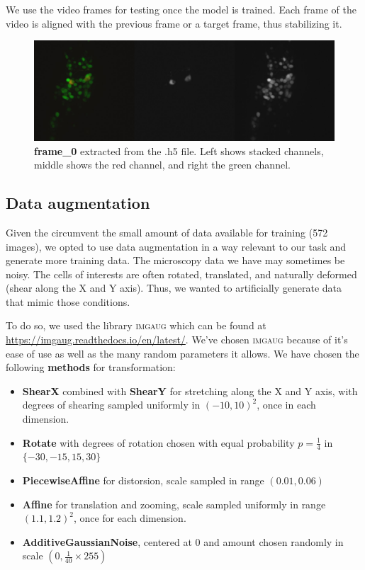 \documentclass[10pt,conference,compsocconf]{IEEEtran}
\begin{document}
We use the video frames for testing once the model is trained. Each frame of the video is aligned with the previous frame or a target frame, thus stabilizing it.

\vspace{-0.2cm}
\begin{figure}[h!]
    \centering
    \includegraphics[scale = 0.16]{extracted_frame_0.png}
    \vspace{-0.2cm}
    \caption{\textbf{frame\_0} extracted from the .h5 file. Left shows stacked channels, middle shows the red channel, and right the green channel.}
    \label{fig:extracted}
\end{figure}
\subsection{Data augmentation}
Given the circumvent the small amount of data available for training (572 images), we opted to use data augmentation in a way relevant to our task and generate more training data. The microscopy data we have may sometimes be noisy. The cells of interests are often rotated, translated, and naturally deformed (shear along the X and Y axis). Thus, we wanted to artificially generate data that mimic those conditions.

To do so, we used the library \textsc{imgaug} which can be found at \url{https://imgaug.readthedocs.io/en/latest/}. We've chosen \textsc{imgaug} because of it's ease of use as well as the many random parameters it allows.
We have chosen the following \textbf{methods} for transformation: 

\begin{itemize}
    \item \textbf{ShearX} combined with \textbf{ShearY} for stretching along the X and Y axis, with degrees of shearing sampled uniformly in $(-10,10)^{2}$, once in each dimension.
    \item \textbf{Rotate} with degrees of rotation chosen with equal probability $p=\frac{1}{4}$ in $\{-30,-15, 15, 30\}$
    \item \textbf{PiecewiseAffine} for distorsion, scale sampled in range $(0.01,0.06)$
    \item \textbf{Affine} for translation and zooming, scale sampled uniformly in range $(1.1, 1.2)^{2}$, once for each dimension.
    \item \textbf{AdditiveGaussianNoise}, centered at 0 and amount chosen randomly in scale $(0, \frac{1}{40}\times{255})$
\end{itemize}
\end{document}
